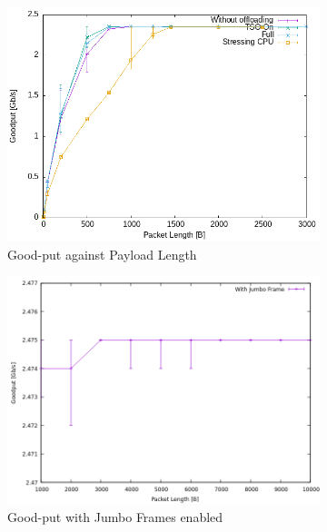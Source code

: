 \documentclass{exam}
\begin{document}
\begin{figure}[H]
    \centering
    \begin{subfigure}[b]{0.40\textwidth}
        \centering
        \includegraphics[width=\textwidth]{nttcp/throughput.png}
        \caption{Good-put against Payload Length}
        \label{fig:n-good}
    \end{subfigure}
    \hfill
        \begin{subfigure}[b]{0.40\textwidth}
        \centering
        \includegraphics[width=\textwidth]{nttcp/throughput_j.png}
        \caption{Good-put with Jumbo Frames enabled}
        \label{fig:n-good-j}
    \end{subfigure}
    \hfill
    \begin{subfigure}[b]{0.40\textwidth}

\end{subfigure}
\end{figure}
\end{document}
